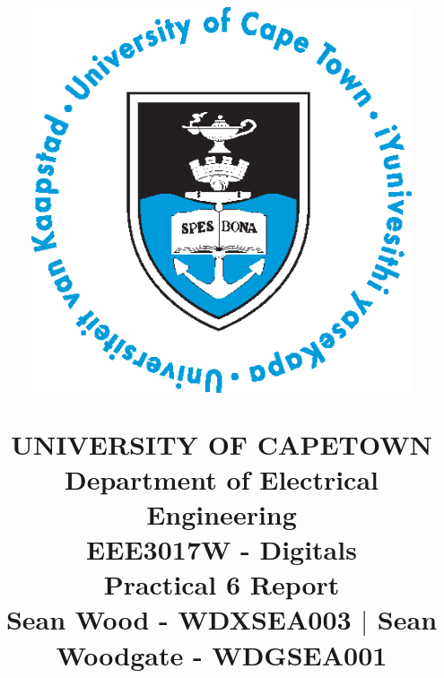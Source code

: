 
\newcommand{\reportTitle}{Practical 6 Report} %
\newcommand{\reportDueDate}{Wednesday,\ September\ 03,\ 2014}                    %
\newcommand{\reportClass}{EEE3017W - Digitals}                               %
\newcommand{\reportClassTime}{10:30am}                                 %
\newcommand{\reportClassInstructor}{Jones}                               %
\newcommand{\reportAuthorName}{Sean Wood - WDXSEA003 $|$ Sean Woodgate - WDGSEA001}                           %
\newcommand{\reportDepartment}{Department of Electrical Engineering}           %


\title{
\begin{figure}[H]
  \begin{center}
    \includegraphics[width=0.4\columnwidth]{uct-logo}
  \end{center}
\end{figure}
\textmd{\Huge UNIVERSITY OF CAPETOWN \\ \LARGE \reportDepartment} \\
\vspace{2in}
\textmd{\textbf{\LARGE \reportClass\\ \Huge \reportTitle \\ \vspace{1.5in} \Large \reportAuthorName}}\\
}

